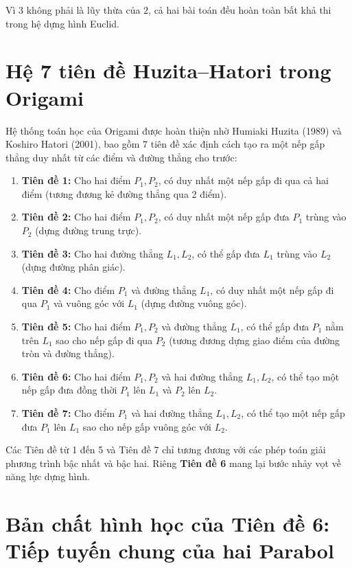 Vì $3$ không phải là lũy thừa của $2$, cả hai bài toán đều hoàn toàn bất khả thi trong hệ dựng hình Euclid.

\section{Hệ 7 tiên đề Huzita--Hatori trong Origami}

Hệ thống toán học của Origami được hoàn thiện nhờ Humiaki Huzita (1989) và Koshiro Hatori (2001), bao gồm 7 tiên đề xác định cách tạo ra một nếp gấp thẳng duy nhất từ các điểm và đường thẳng cho trước:

\begin{enumerate}
    \item \textbf{Tiên đề 1:} Cho hai điểm $P_1, P_2$, có duy nhất một nếp gấp đi qua cả hai điểm (tương đương kẻ đường thẳng qua 2 điểm).
    \item \textbf{Tiên đề 2:} Cho hai điểm $P_1, P_2$, có duy nhất một nếp gấp đưa $P_1$ trùng vào $P_2$ (dựng đường trung trực).
    \item \textbf{Tiên đề 3:} Cho hai đường thẳng $L_1, L_2$, có thể gấp đưa $L_1$ trùng vào $L_2$ (dựng đường phân giác).
    \item \textbf{Tiên đề 4:} Cho điểm $P_1$ và đường thẳng $L_1$, có duy nhất một nếp gấp đi qua $P_1$ và vuông góc với $L_1$ (dựng đường vuông góc).
    \item \textbf{Tiên đề 5:} Cho hai điểm $P_1, P_2$ và đường thẳng $L_1$, có thể gấp đưa $P_1$ nằm trên $L_1$ sao cho nếp gấp đi qua $P_2$ (tương đương dựng giao điểm của đường tròn và đường thẳng).
    \item \textbf{Tiên đề 6:} Cho hai điểm $P_1, P_2$ và hai đường thẳng $L_1, L_2$, có thể tạo một nếp gấp đưa đồng thời $P_1$ lên $L_1$ và $P_2$ lên $L_2$.
    \item \textbf{Tiên đề 7:} Cho điểm $P_1$ và hai đường thẳng $L_1, L_2$, có thể tạo một nếp gấp đưa $P_1$ lên $L_1$ sao cho nếp gấp vuông góc với $L_2$.
\end{enumerate}

Các Tiên đề từ 1 đến 5 và Tiên đề 7 chỉ tương đương với các phép toán giải phương trình bậc nhất và bậc hai. Riêng \textbf{Tiên đề 6} mang lại bước nhảy vọt về năng lực dựng hình.

\section{Bản chất hình học của Tiên đề 6: Tiếp tuyến chung của hai Parabol}

